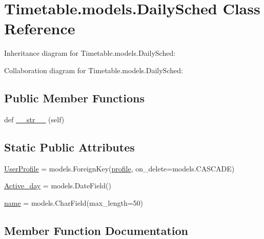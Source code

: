 \hypertarget{classTimetable_1_1models_1_1DailySched}{}\section{Timetable.\+models.\+Daily\+Sched Class Reference}
\label{classTimetable_1_1models_1_1DailySched}


Inheritance diagram for Timetable.\+models.\+Daily\+Sched\+:


Collaboration diagram for Timetable.\+models.\+Daily\+Sched\+:
\subsection*{Public Member Functions}
\begin{DoxyCompactItemize}
\item 
def \hyperlink{classTimetable_1_1models_1_1DailySched_afc89859045c9ab26ee4384539bac3348}{\+\_\+\+\_\+str\+\_\+\+\_\+} (self)
\end{DoxyCompactItemize}
\subsection*{Static Public Attributes}
\begin{DoxyCompactItemize}
\item 
\hyperlink{classTimetable_1_1models_1_1DailySched_acad42885d916b028599f5d83e4d3be6a}{User\+Profile} = models.\+Foreign\+Key(\hyperlink{classprofiles_1_1models_1_1profile}{profile}, on\+\_\+delete=models.\+C\+A\+S\+C\+A\+DE)
\item 
\hyperlink{classTimetable_1_1models_1_1DailySched_afc7c1d3dbfdb85f9b288c22eca98768f}{Active\+\_\+day} = models.\+Date\+Field()
\item 
\hyperlink{classTimetable_1_1models_1_1DailySched_ac6ba7d5a39e3d85d102b1e6bee3deb28}{name} = models.\+Char\+Field(max\+\_\+length=50)
\end{DoxyCompactItemize}


\subsection{Member Function Documentation}
